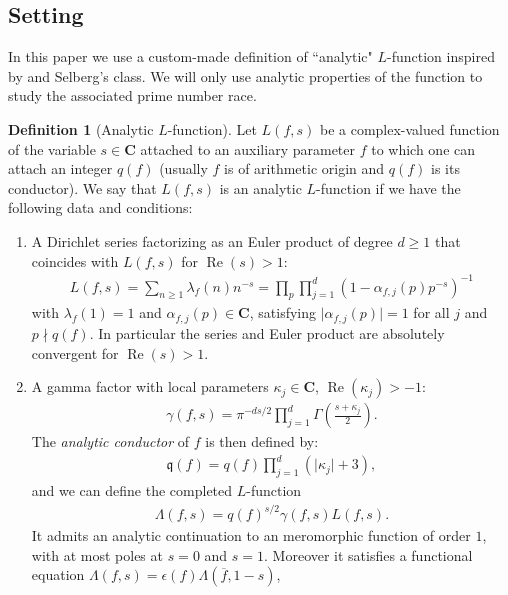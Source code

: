 \documentclass[a4paper,10pt]{amsart}
\theoremstyle{plain}
\theoremstyle{definition}
\newtheorem{defi}{Definition}
\begin{document}
\subsection{Setting}\label{subsec_setting}

In this paper we use a custom-made definition of ``analytic" $L$-function inspired by \cite[Chap. 5]{IK} and Selberg's class.
We will only use analytic properties of the function to study the associated prime number race.

\begin{defi}[Analytic $L$-function]\label{Def_Lfunc}
Let $L(f,s)$ be a complex-valued function of the variable $s\in\mathbf{C}$ attached to an auxiliary parameter $f$ to which one can attach an integer $q(f)$ (usually $f$ is of arithmetic origin and $q(f)$ is its conductor). 
We say that $L(f,s)$ is an analytic $L$-function if we have the following data and conditions:
\begin{enumerate}
\item\label{Hyp_Euler+RamanujanPetersson} A Dirichlet series factorizing as an Euler product of degree $d\geq 1$ that coincides with $L(f,s)$ for $\operatorname{Re}(s)>1$:
\begin{align*}
L(f,s) = \sum_{n\geq 1} \lambda_{f}(n)n^{-s} = \prod_{p}\prod_{j=1}^{d}\left(1-\alpha_{f,j}(p)p^{-s}\right)^{-1}
\end{align*}
with $\lambda_{f}(1)=1$ and $\alpha_{f,j}(p) \in \mathbf{C}$,
satisfying $\lvert \alpha_{f,j}(p)\rvert=1$ for all $j$ and $p\nmid q(f)$.
In particular the series and Euler product are absolutely convergent for $\operatorname{Re}(s)>1$.
\item\label{Hyp_FunctEquation} A gamma factor with local parameters $\kappa_{j}\in\mathbf{C}$, $\operatorname{Re}(\kappa_{j})>-1$:
\begin{align*}
\gamma(f,s) = \pi^{-ds/2}\prod_{j=1}^{d}\Gamma\left(\frac{s + \kappa_{j}}{2}\right).
\end{align*}
The \emph{analytic conductor} of $f$ is then defined by: 
\begin{align*}
\mathfrak{q}(f) = q(f)\prod_{j=1}^{d}\left( \lvert \kappa_{j}\rvert + 3\right),
\end{align*}
and we can define the completed $L$-function
\begin{align*}
\Lambda(f,s) =  q(f)^{s/2}\gamma(f,s)L(f,s).
\end{align*}
It admits an analytic continuation to an meromorphic function of order $1$, with at most poles at $s=0$ and $s=1$.
Moreover it satisfies a functional equation $\Lambda(f,s)=\epsilon(f)\Lambda(\overline{f},1-s)$, 

\end{enumerate}
\end{defi}
\end{document}
